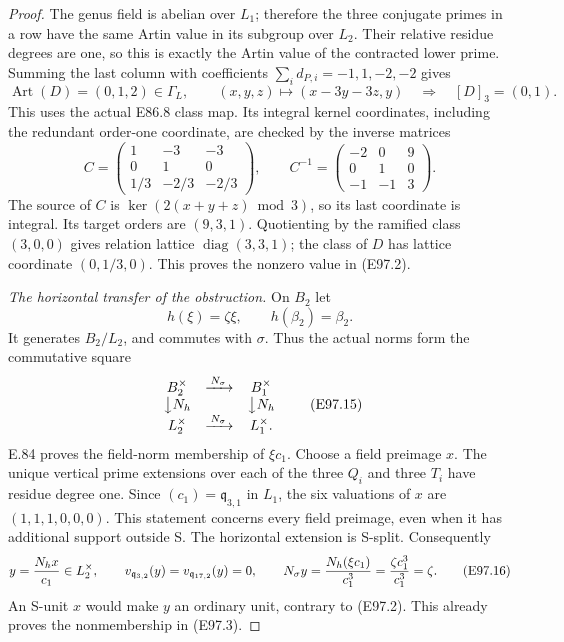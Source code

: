 \begin{proof}
The genus field is abelian over \(L_1\); therefore the
three conjugate primes in a row have the same Artin
value in its subgroup over \(L_2\). Their relative
residue degrees are one, so this is exactly the
Artin value of the contracted lower prime. Summing
the last column with coefficients
\(\sum_i d_{P,i}=-1,1,-2,-2\) gives
\[
 \operatorname{Art}(D)=(0,1,2)\in\Gamma_L,\qquad
 (x,y,z)\longmapsto(x-3y-3z,y)
       \quad\Longrightarrow\quad [D]_3=(0,1).
 \tag{E97.12}
\]
This uses the actual E86.8 class map. Its integral
kernel coordinates, including the redundant order-one
coordinate, are checked by the inverse matrices
\[
 C=\begin{pmatrix}1&-3&-3\\0&1&0\\1/3&-2/3&-2/3\end{pmatrix},
 \qquad
 C^{-1}=\begin{pmatrix}-2&0&9\\0&1&0\\-1&-1&3\end{pmatrix}.
 \tag{E97.13}
\]
The source of \(C\) is \(\ker(2(x+y+z)\bmod3)\),
so its last coordinate is integral. Its target orders
are \((9,3,1)\). Quotienting by the ramified class
\((3,0,0)\) gives relation lattice
\(\operatorname{diag}(3,3,1)\); the class of \(D\)
has lattice coordinate \((0,1/3,0)\).
This proves the nonzero value in (E97.2).

\emph{The horizontal transfer of the obstruction.}
On \(B_2\) let
\[
 h(\xi)=\zeta\xi,\qquad h(\beta_2)=\beta_2 .
 \tag{E97.14}
\]
It generates \(B_2/L_2\), and commutes with \(\sigma\).
Thus the actual norms form the commutative square
\[
 \begin{array}{ccc}
 B_2^\times&\xrightarrow{\,N_\sigma\,}&B_1^\times\\
 \big\downarrow N_h&&\big\downarrow N_h\\
 L_2^\times&\xrightarrow{\,N_\sigma\,}&L_1^\times .
 \end{array}
 \tag{E97.15}
\]
E.84 proves the field-norm membership of \(\xi c_1\).
Choose a field preimage \(x\). The unique vertical
prime extensions over each of the three \(Q_i\)
and three \(T_i\) have residue degree one. Since
\((c_1)=\mathfrak q_{3,1}\) in \(L_1\), the six
valuations of \(x\) are \((1,1,1,0,0,0)\).
This statement concerns every field preimage, even
when it has additional support outside S.
The horizontal extension is S-split. Consequently
\[
 y={N_hx\over c_1}\in L_2^\times,\qquad
 v_{\mathfrak q_{3,2}}(y)=v_{\mathfrak q_{17,2}}(y)=0,
 \qquad
 N_\sigma y={N_h(\xi c_1)\over c_1^3}
             ={\zeta c_1^3\over c_1^3}=\zeta .
 \tag{E97.16}
\]
An S-unit \(x\) would make \(y\) an ordinary unit,
contrary to (E97.2). This already proves
the nonmembership in (E97.3).


\end{proof}
